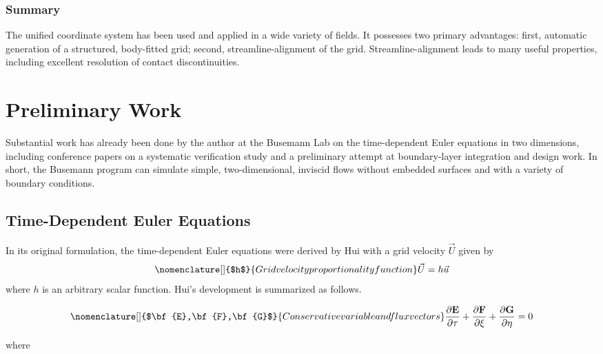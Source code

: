\documentclass[12pt,letterpaper]{article}
\begin{document}
\subsubsection{Summary}
The unified coordinate system has been used and applied in a wide
variety of fields. It possesses two primary advantages: first,
automatic generation of a structured, body-fitted grid; second,
streamline-alignment of the grid. Streamline-alignment leads to many 
useful properties, including excellent resolution of contact
discontinuities. 
\section{Preliminary Work}
Substantial work has already been done by the author at the Busemann Lab
on the time-dependent Euler
equations in two dimensions, including conference papers on a
systematic verification study\cite{woodsCFD11} and a preliminary
attempt at boundary-layer integration and design
work\cite{woodsJPC11}. In short, the Busemann program can 
simulate simple, two-dimensional, inviscid flows without embedded
surfaces and with a variety of boundary conditions. 

\subsection{Time-Dependent Euler Equations}
In its original formulation, the time-dependent Euler equations were
derived by Hui\cite{hui99} with a grid velocity $\vec{U}$ given by
\begin{equation}
\nomenclature[]{$h$}{Grid velocity proportionality function}
\vec{U}=h\vec{u}
\end{equation}
\noindent where $h$ is an arbitrary scalar function. Hui's development is
summarized as follows.

\begin{equation}
\label{eq:conservation}
\nomenclature[]{$\bf{E},\bf{F},\bf{G}$}{Conservative variable and flux vectors}
\frac{\partial \bf{E}}{\partial \tau} + \frac{\partial \bf{F}}{\partial \xi} + \frac{\partial \bf{G}}{\partial \eta} = 0
\end{equation}

\noindent where
\end{document}

